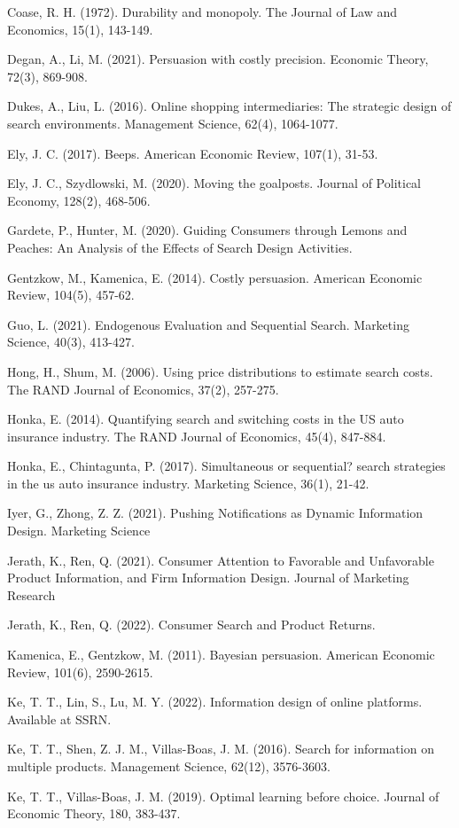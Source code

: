 \documentclass[11pt]{extarticle}
\begin{document}
Coase, R. H. (1972). Durability and monopoly. The Journal of Law and Economics, 15(1), 143-149.

Degan, A., Li, M. (2021). Persuasion with costly precision. Economic Theory, 72(3), 869-908.

Dukes, A., Liu, L. (2016). Online shopping intermediaries: The strategic design of search environments. Management Science, 62(4), 1064-1077.

Ely, J. C. (2017). Beeps. American Economic Review, 107(1), 31-53.

Ely, J. C., Szydlowski, M. (2020). Moving the goalposts. Journal of Political Economy, 128(2), 468-506.

Gardete, P., Hunter, M. (2020). Guiding Consumers through Lemons and Peaches: An Analysis of the Effects of Search Design Activities.

Gentzkow, M., Kamenica, E. (2014). Costly persuasion. American Economic Review, 104(5), 457-62.

Guo, L. (2021). Endogenous Evaluation and Sequential Search. Marketing Science, 40(3), 413-427.

Hong, H., Shum, M. (2006). Using price distributions to estimate search costs. The RAND Journal of Economics, 37(2), 257-275.

Honka, E. (2014). Quantifying search and switching costs in the US auto insurance industry. The RAND Journal of Economics, 45(4), 847-884.

Honka, E., Chintagunta, P. (2017). Simultaneous or sequential? search strategies in the us auto insurance industry. Marketing Science, 36(1), 21-42.

Iyer, G., Zhong, Z. Z. (2021). Pushing Notifications as Dynamic Information Design. Marketing Science

Jerath, K., Ren, Q. (2021). Consumer Attention to Favorable and Unfavorable Product Information, and Firm Information Design. Journal of Marketing Research

Jerath, K., Ren, Q. (2022). Consumer Search and Product Returns.

Kamenica, E., Gentzkow, M. (2011). Bayesian persuasion. American Economic Review, 101(6), 2590-2615.

Ke, T. T., Lin, S., Lu, M. Y. (2022). Information design of online platforms. Available at SSRN.

Ke, T. T., Shen, Z. J. M., Villas-Boas, J. M. (2016). Search for information on multiple products. Management Science, 62(12), 3576-3603.

Ke, T. T., Villas-Boas, J. M. (2019). Optimal learning before choice. Journal of Economic Theory, 180, 383-437.
\end{document}
